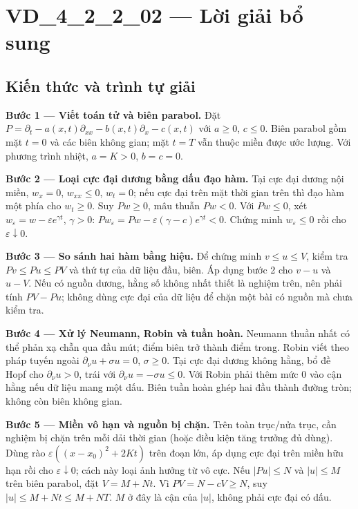 \documentclass[10pt,a4paper]{article}
\begin{document}
\section*{VD\_4\_2\_2\_02 — Lời giải bổ sung}
\subsection*{Kiến thức và trình tự giải}
\textbf{Bước 1 — Viết toán tử và biên parabol.} Đặt $P=\partial_t-a(x,t)\partial_{xx}-b(x,t)\partial_x-c(x,t)$ với $a\ge0$, $c\le0$. Biên parabol gồm mặt $t=0$ và các biên không gian; mặt $t=T$ vẫn thuộc miền được ước lượng. Với phương trình nhiệt, $a=K>0$, $b=c=0$.

\textbf{Bước 2 — Loại cực đại dương bằng dấu đạo hàm.} Tại cực đại dương nội miền, $w_x=0$, $w_{xx}\le0$, $w_t=0$; nếu cực đại trên mặt thời gian trên thì đạo hàm một phía cho $w_t\ge0$. Suy $Pw\ge0$, mâu thuẫn $Pw<0$. Với $Pw\le0$, xét $w_\varepsilon=w-\varepsilon e^{\gamma t}$, $\gamma>0$: $Pw_\varepsilon=Pw-\varepsilon(\gamma-c)e^{\gamma t}<0$. Chứng minh $w_\varepsilon\le0$ rồi cho $\varepsilon\downarrow0$.

\textbf{Bước 3 — So sánh hai hàm bằng hiệu.} Để chứng minh $v\le u\le V$, kiểm tra $Pv\le Pu\le PV$ và thứ tự của dữ liệu đầu, biên. Áp dụng bước 2 cho $v-u$ và $u-V$. Nếu có nguồn dương, hằng số không nhất thiết là nghiệm trên, nên phải tính $PV-Pu$; không dùng cực đại của dữ liệu để chặn một bài có nguồn mà chưa kiểm tra.

\textbf{Bước 4 — Xử lý Neumann, Robin và tuần hoàn.} Neumann thuần nhất có thể phản xạ chẵn qua đầu mút; điểm biên trở thành điểm trong. Robin viết theo pháp tuyến ngoài $\partial_\nu u+\sigma u=0$, $\sigma\ge0$. Tại cực đại dương không hằng, bổ đề Hopf cho $\partial_\nu u>0$, trái với $\partial_\nu u=-\sigma u\le0$. Với Robin phải thêm mức $0$ vào cận hằng nếu dữ liệu mang một dấu. Biên tuần hoàn ghép hai đầu thành đường tròn; không còn biên không gian.

\textbf{Bước 5 — Miền vô hạn và nguồn bị chặn.} Trên toàn trục/nửa trục, cần nghiệm bị chặn trên mỗi dải thời gian (hoặc điều kiện tăng trưởng đủ dùng). Dùng rào $\varepsilon((x-x_0)^2+2Kt)$ trên đoạn lớn, áp dụng cực đại trên miền hữu hạn rồi cho $\varepsilon\downarrow0$; cách này loại ảnh hưởng từ vô cực. Nếu $|Pu|\le N$ và $|u|\le M$ trên biên parabol, đặt $V=M+Nt$. Vì $PV=N-cV\ge N$, suy $|u|\le M+Nt\le M+NT$. $M$ ở đây là cận của $|u|$, không phải cực đại có dấu.
\end{document}
